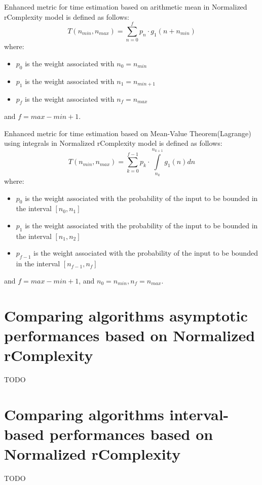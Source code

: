 \begin{definition} Enhanced metric for time estimation based on arithmetic mean in Normalized rComplexity model is defined as follows:
\[  T(n_{min}, n_{max}) = \sum\limits_{n=0}^{f} p_{n} \cdot g_{1}(n + n_{min})  \]
where:
\begin{itemize}
	\item $p_{0}$ is the weight associated with $n_{0} = n_{min}$
	\item $p_{1}$ is the weight associated with $n_{1} = n_{min + 1}$
	\item $p_{f}$ is the weight associated with $n_{f} = n_{max}$
\end{itemize}
and $f = max - min + 1$.
\end{definition}

\begin{definition} Enhanced metric for time estimation based on Mean-Value Theorem(Lagrange) using integrals in Normalized rComplexity model is defined as follows:
\[  T(n_{min}, n_{max}) =\sum\limits_{k=0}^{f-1} p_{k} \cdot \int\limits_{n_{k}}^{n_{k+1}} g_{1}(n) dn  \]
where:
\begin{itemize}
	\item $p_{0}$ is the weight associated with the probability of the input to be bounded in the interval $[n_{0}, n_{1}]$
	\item $p_{1}$ is the weight associated with the probability of the input to be bounded in the interval $[n_{1}, n_{2}]$
	\item $p_{f-1}$ is the weight associated with the probability of the input to be bounded in the interval $[n_{f-1}, n_{f}]$
\end{itemize}
and $f = max - min + 1$, and $n_{0} = n_{min}, n_{f} = n_{max}$.
\end{definition}

\section{Comparing algorithms asymptotic performances based on Normalized rComplexity}
TODO

\section{Comparing algorithms interval-based performances based on Normalized rComplexity}
TODO

